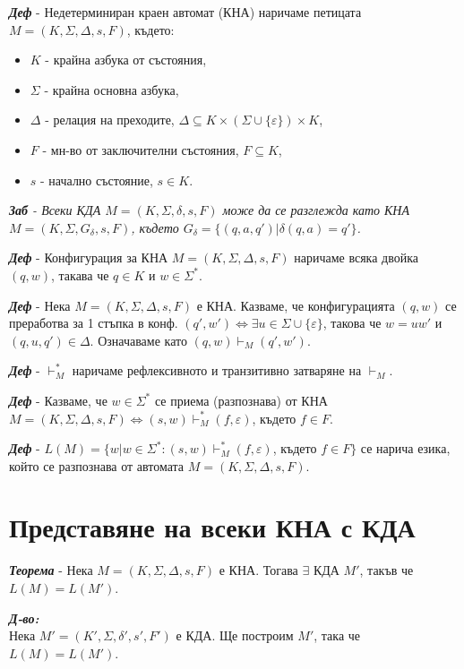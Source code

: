 \documentclass[fleqn,12pt]{article}
\begin{document}
\begin{flushleft}
\textit{\textbf{Деф}} - Недетерминиран краен автомат (КНА) наричаме петицата $M = (K, \Sigma, \Delta, s, F)$, където:
\begin{itemize}
    \item $K$ - крайна азбука от състояния,
    \item $\Sigma$ - крайна основна азбука,
    \item $\Delta$ - релация на преходите, $\Delta \subseteq K \times (\Sigma \cup \{ \varepsilon \} ) \times K$,
    \item $F$ - мн-во от заключителни състояния, $F \subseteq K$,
    \item $s$ - начално състояние, $s \in K$.
\end{itemize}

\textit{\textbf{Заб} - Всеки КДА $M = (K, \Sigma, \delta, s, F)$ може да се разглежда като КНА $M = (K, \Sigma, G_\delta, s, F)$, където $G_\delta = \{(q, a, q') | \delta(q, a) = q' \}$.}

\textit{\textbf{Деф}} - Конфигурация за КНА $M = (K, \Sigma, \Delta, s, F)$ наричаме всяка двойка $(q, w)$, такава че $q \in K$ и $w \in \Sigma^*$.

\textit{\textbf{Деф}} - Нека $M = (K, \Sigma, \Delta, s, F)$ е КНА. Казваме, че конфигурацията $(q, w)$ се преработва за 1 стъпка в конф. $(q', w') \iff \exists u \in \Sigma \cup \{\varepsilon\}$, такова че $w = uw'$ и $(q, u, q') \in \Delta$. Означаваме като $(q, w) \vdash_M (q', w')$.

\textit{\textbf{Деф}} - $\vdash_M^*$ наричаме рефлексивното и транзитивно затваряне на $\vdash_M$.

\textit{\textbf{Деф}} - Казваме, че $w \in \Sigma^*$ се приема (разпознава) от КНА $M = (K, \Sigma, \Delta, s, F) \iff (s, w) \vdash_M^* (f, \varepsilon)$, където $f \in F$. 

\textit{\textbf{Деф}} - $L(M) = \{w | w \in \Sigma^*: (s, w) \vdash_M^* (f, \varepsilon)$, където $f \in F\}$ се нарича езика, който се разпознава от автомата $M = (K, \Sigma, \Delta, s, F)$.

\section{Представяне на всеки КНА с КДА}

\textit{\textbf{Теорема}} - Нека $M = (K, \Sigma, \Delta, s, F)$ е КНА. Тогава $\exists$ КДА $M'$, такъв че $L(M) = L(M')$.

\textit{\textbf{Д-во:}} \\
Нека $M' = (K', \Sigma, \delta', s', F')$ е КДА. Ще построим $M'$, така че $L(M) = L(M')$.


\end{flushleft}
\end{document}
